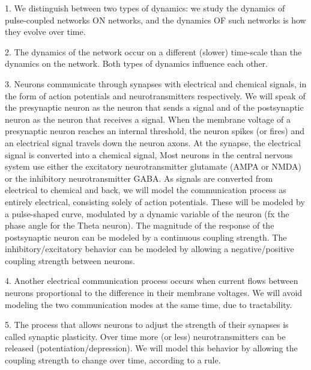



1. We distinguish between two types of dynamics: we study the dynamics of pulse-coupled networks ON networks, and the dynamics OF such networks is how they evolve over time.

2. The dynamics of the network occur on a different (slower) time-scale than the dynamics on the network. Both types of dynamics influence each other.

3. Neurons communicate through synapses with electrical and chemical signals, in the form of action potentials and neurotransmitters respectively. We will speak of the presynaptic neuron as the neuron that sends a signal and of the postsynaptic neuron as the neuron that receives a signal. When the membrane voltage of a presynaptic neuron reaches an internal threshold, the neuron spikes (or fires) and an electrical signal travels down the neuron axons. At the synapse, the electrical signal is converted into a chemical signal, 
Most neurons in the central nervous system use either the excitatory neurotransmitter glutamate (AMPA or NMDA) or the inhibitory neurotransmitter GABA. 
As signals are converted from electrical to chemical and back, we will model the communication process as entirely electrical, consisting solely of action potentials. These will be modeled by a pulse-shaped curve, modulated by a dynamic variable of the neuron (fx the phase angle for the Theta neuron). The magnitude of the response of the postsynaptic neuron can be modeled by a continuous coupling strength. The inhibitory/excitatory behavior can be modeled by allowing a negative/positive coupling strength between neurons. 

4. Another electrical communication process occurs when current flows between neurons proportional to the difference in their membrane voltages. We will avoid modeling the two communication modes at the same time, due to tractability. 

5. The process that allows neurons to adjust the strength of their synapses is called synaptic plasticity. Over time more (or less) neurotransmitters can be released (potentiation/depression). We will model this behavior by allowing the coupling strength to change over time, according to a rule.

